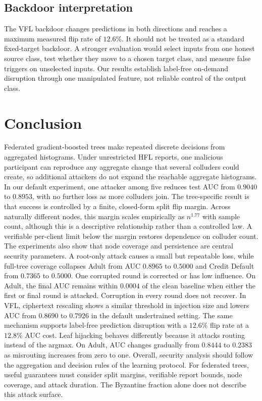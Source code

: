 \documentclass[11pt]{article}
\begin{document}
\subsection{Backdoor interpretation}

The VFL backdoor changes predictions in both directions and reaches a maximum measured flip rate of $12.6\%$. It should not be treated as a standard fixed-target backdoor. A stronger evaluation would select inputs from one honest source class, test whether they move to a chosen target class, and measure false triggers on unselected inputs. Our results establish label-free on-demand disruption through one manipulated feature, not reliable control of the output class.

\section{Conclusion}
\label{sec:conclusion}

Federated gradient-boosted trees make repeated discrete decisions from aggregated histograms. Under unrestricted HFL reports, one malicious participant can reproduce any aggregate change that several colluders could create, so additional attackers do not expand the reachable aggregate histograms. In our default experiment, one attacker among five reduces test AUC from $0.9040$ to $0.8953$, with no further loss as more colluders join. The tree-specific result is that success is controlled by a finite, closed-form split flip margin. Across naturally different nodes, this margin scales empirically as $n^{1.77}$ with sample count, although this is a descriptive relationship rather than a controlled law. A verifiable per-client limit below the margin restores dependence on colluder count. The experiments also show that node coverage and persistence are central security parameters. A root-only attack causes a small but repeatable loss, while full-tree coverage collapses Adult from AUC $0.8965$ to $0.5000$ and Credit Default from $0.7365$ to $0.5000$. One corrupted round is corrected or has low influence. On Adult, the final AUC remains within $0.0004$ of the clean baseline when either the first or final round is attacked. Corruption in every round does not recover. In VFL, ciphertext rescaling shows a similar threshold in injection size and lowers AUC from $0.8690$ to $0.7926$ in the default undertrained setting. The same mechanism supports label-free prediction disruption with a $12.6\%$ flip rate at a $12.8\%$ AUC cost. Leaf hijacking behaves differently because it attacks routing instead of the argmax. On Adult, AUC changes gradually from $0.8444$ to $0.2383$ as misrouting increases from zero to one. Overall, security analysis should follow the aggregation and decision rules of the learning protocol. For federated trees, useful guarantees must consider split margins, verifiable report bounds, node coverage, and attack duration. The Byzantine fraction alone does not describe this attack surface.
\end{document}

